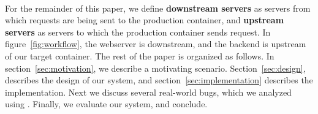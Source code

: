 \begin{itemize}[leftmargin=*,topsep=0pt,itemsep=-1ex,partopsep=1ex,parsep=1ex]

\end{itemize}


\noindent
\\ For the remainder of this paper, we define \textbf{downstream servers} as servers from which requests are being sent to the production container, and \textbf{upstream servers} as servers to which the production container sends request. 
In figure~\ref{fig:workflow}, the webserver is downstream, and the backend is upstream of our target container.
The rest of the paper is organized as follows.
In section~\ref{sec:motivation}, we describe a motivating scenario.
Section~\ref{sec:design}, describes the design of our system, and section~\ref{sec:implementation} describes the implementation.
Next we discuss several real-world bugs, which we analyzed using \parikshan.
Finally, we evaluate our system, and conclude. 

